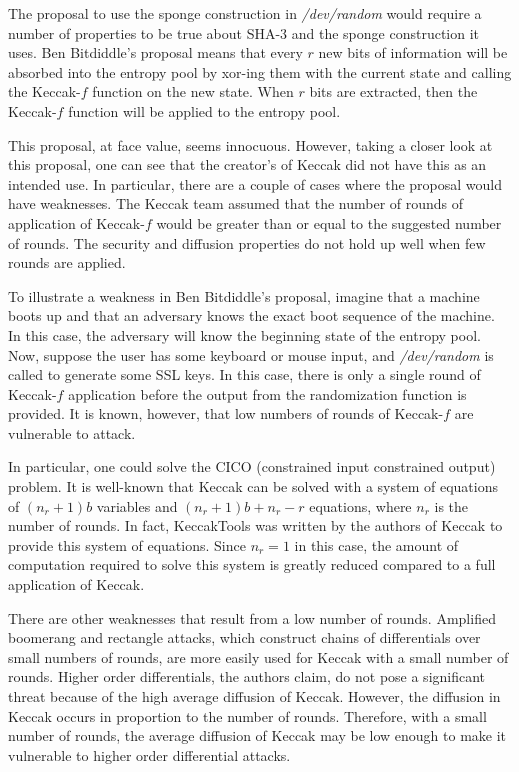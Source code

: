 \documentclass[psamsfonts]{amsart}
\begin{document}
The proposal to use the sponge construction in \emph{/dev/random} would require a number of properties to be true about SHA-3 and the sponge construction it uses. Ben Bitdiddle's proposal means that every $r$ new bits of information will be absorbed into the entropy pool by xor-ing them with the current state and calling the Keccak-$f$ function on the new state. When $r$ bits are extracted, then the Keccak-$f$ function will be applied to the entropy pool.

This proposal, at face value, seems innocuous. However, taking a closer look at this proposal, one can see that the creator's of Keccak did not have this as an intended use. In particular, there are a couple of cases where the proposal would have weaknesses. The Keccak team assumed that the number of rounds of application of Keccak-$f$ would be greater than or equal to the suggested number of rounds. The security and diffusion properties do not hold up well when few rounds are applied.

To illustrate a weakness in Ben Bitdiddle's proposal, imagine that a machine boots up and that an adversary knows the exact boot sequence of the machine. In this case, the adversary will know the beginning state of the entropy pool. Now, suppose the user has some keyboard or mouse input, and \emph{/dev/random} is called to generate some SSL keys. In this case, there is only a single round of Keccak-$f$ application before the output from the randomization function is provided. It is known, however, that low numbers of rounds of Keccak-$f$ are vulnerable to attack.

In particular, one could solve the CICO (constrained input constrained output) problem. It is well-known that Keccak can be solved with a system of equations of $(n_r + 1)b$ variables and $(n_r+1)b + n_r - r$ equations, where $n_r$ is the number of rounds. In fact, KeccakTools was written by the authors of Keccak to provide this system of equations. Since $n_r = 1$ in this case, the amount of computation required to solve this system is greatly reduced compared to a full application of Keccak.

There are other weaknesses that result from a low number of rounds. Amplified boomerang and rectangle attacks, which construct chains of differentials over small numbers of rounds, are more easily used for Keccak with a small number of rounds. Higher order differentials, the authors claim, do not pose a significant threat because of the high average diffusion of Keccak. However, the diffusion in Keccak occurs in proportion to the number of rounds. Therefore, with a small number of rounds, the average diffusion of Keccak may be low enough to make it vulnerable to higher order differential attacks. 
\end{document}

